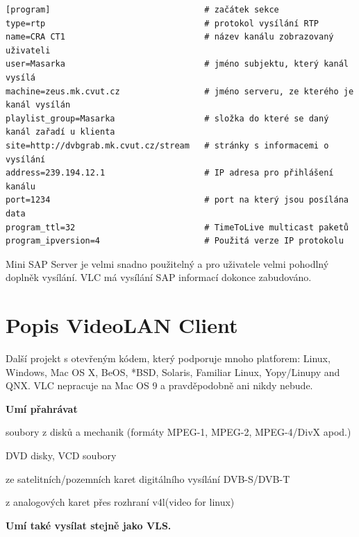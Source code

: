 \begin{small}
\begin{verbatim}
[program]                               # začátek sekce
type=rtp                                # protokol vysílání RTP
name=CRA CT1                            # název kanálu zobrazovaný uživateli
user=Masarka                            # jméno subjektu, který kanál vysílá
machine=zeus.mk.cvut.cz                 # jméno serveru, ze kterého je kanál vysílán
playlist_group=Masarka                  # složka do které se daný kanál zařadí u klienta
site=http://dvbgrab.mk.cvut.cz/stream   # stránky s informacemi o vysílání
address=239.194.12.1                    # IP adresa pro přihlášení kanálu
port=1234                               # port na který jsou posílána data
program_ttl=32                          # TimeToLive multicast paketů
program_ipversion=4                     # Použitá verze IP protokolu
\end{verbatim}
\end{small}

\vspace{10pt}

Mini SAP Server je velmi snadno použitelný a pro uživatele velmi pohodlný doplněk vysílání. VLC má vysílání SAP informací dokonce zabudováno.

\vspace{10pt}

\section{Popis VideoLAN Client}

Další projekt s otevřeným kódem, který podporuje mnoho platforem: Linux, Windows, Mac OS X, BeOS, *BSD, Solaris, Familiar Linux, Yopy/Linupy and QNX. VLC nepracuje na Mac OS 9 a pravděpodobně ani nikdy nebude.

\vspace{10pt}

\textbf{Umí přahrávat}

soubory z disků a mechanik (formáty MPEG-1, MPEG-2, MPEG-4/DivX apod.)

DVD disky, VCD soubory

ze satelitních/pozemních karet digitálního vysílání DVB-S/DVB-T

z analogových karet přes rozhraní v4l(video for linux)

\vspace{10pt}

\textbf{Umí také vysílat stejně jako VLS.}

